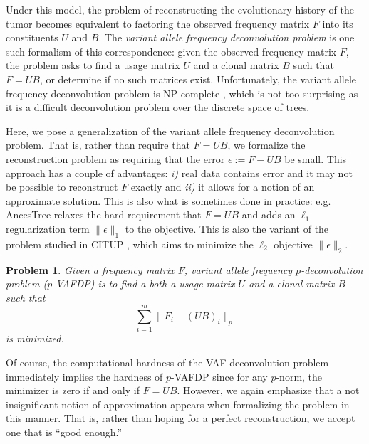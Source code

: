 \documentclass[10pt]{article}
\newtheorem{problem}{Problem}
\begin{document}
Under this model, the problem of reconstructing the evolutionary history of the tumor
becomes equivalent to factoring the observed frequency matrix $F$ into its constituents $U$ and $B$.
The \emph{variant allele frequency deconvolution problem} \cite{el-kebir_reconstruction_2015}
is one such formalism of this correspondence: given the observed frequency matrix $F$, 
the problem asks to find a usage matrix $U$ and a clonal matrix $B$ such that $F = UB$, or determine
if no such matrices exist. Unfortunately, the variant allele frequency deconvolution problem is 
NP-complete \cite{el-kebir_reconstruction_2015}, which is not too surprising as it is a difficult 
deconvolution problem over the discrete space of trees.

Here, we pose a generalization of the variant allele frequency deconvolution problem.
That is, rather than require that $F = UB$, we formalize the reconstruction problem as
requiring that the error $\epsilon := F - UB$ be small. This approach has
a couple of advantages: \textit{i)} real data contains error and it may not be possible to reconstruct
$F$ exactly and \textit{ii)} it allows for a notion of an approximate solution. This is also what is sometimes done in practice: 
e.g. AncesTree \cite{el-kebir_reconstruction_2015} relaxes the hard requirement that $F = UB$ and 
adds an $\ell_1$ regularization term $\lVert \epsilon \rVert_1$ to the objective.  
This is also the variant of the problem studied in CITUP \cite{malikic_clonality_2015}, which aims to 
minimize the $\ell_2$ objective $\lVert \epsilon \rVert_2$. 

\begin{problem}
  \label{prob:vafp}
  Given a frequency matrix $F$, \emph{variant allele frequency $p$-deconvolution problem} ($p$-VAFDP) is to
  find a both a usage matrix $U$ and a clonal matrix $B$ such that 
  \begin{equation}
    \sum_{i=1}^m\lVert F_i - (UB)_i \rVert_p
  \end{equation}
  is minimized.
\end{problem}

Of course, the computational hardness of the VAF deconvolution problem immediately implies the hardness of 
$p$-VAFDP since for any $p$-norm, the minimizer is zero if and only if $F = UB$. However, we 
again emphasize that a not insignificant notion of approximation appears when formalizing the problem in this 
manner. That is, rather than hoping for a perfect reconstruction, we accept one that is ``good enough.''
\end{document}

